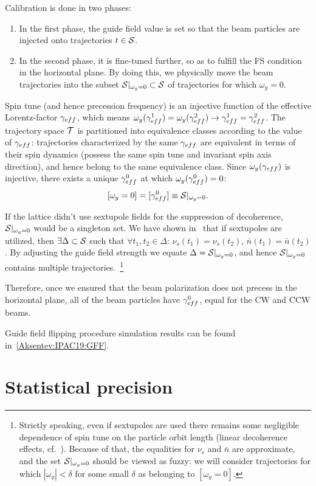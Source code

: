\documentclass[a4paper]{jacow}
\newcommand{\w}{\omega}
\newcommand{\nbar}{\bar n}
\newcommand{\D}{\Delta}
\begin{document}
Calibration is done in two phases:
\begin{enumerate}
\item In the first phase, the guide field value is set so that the beam particles are injected onto trajectories
  $t\in\Stab$.
\item In the second phase, it is fine-tuned further, so as to fulfill the FS condition in the horizontal plane.
  By doing this, we physically move the beam trajectories into the subset $\Stab*\subset\Stab$ of trajectories 
  for which $\w_y = 0$.
\end{enumerate}

Spin tune (and hence precession frequency) is an injective function of the
effective Lorentz-factor $\g*$, which means
$\w_y(\g*^1) = \w_y(\g*^2) \rightarrow \g*^1 = \g*^2$. The trajectory space $\mathcal T$ is partitioned into equivalence
classes according to the value of $\g*$: trajectories characterized by the same $\g*$ are equivalent
in terms of their spin dynamics (possess the same spin tune and invariant spin axis direction),
and hence belong to the same equivalence class.
Since $\w_y(\g*)$ is injective, there exists a unique $\g*^0$ at which $\w_y(\g*^0)=0$:
\[
[\w_y=0] = [\g*^0] \equiv \Stab*.
\]

If the lattice didn't use sextupole fields for the suppression of decoherence,
$\Stab*$ would be a singleton set. We have shown in~\cite{Aksentev:IPAC19:Decoh} that if sextupoles are
utilized, then $\exists\D\subset\Stab$ such that $\forall t_1,t_2\in\D$:
$\nu_s(t_1) = \nu_s(t_2)$, $\nbar(t_1) = \nbar(t_2)$. By adjusting the guide field strength we equate
$\D=\Stab*$, and hence $\Stab*$ contains multiple trajectories.~\footnote{Strictly speaking,
  even if sextupoles are used there remains some negligible dependence of spin tune
  on the particle orbit length (linear decoherence effects, cf.~\cite{Aksentev:IPAC19:Decoh}).
  Because of that, the equalities for $\nu_s$ and $\nbar$ are approximate, and the set $\Stab*$
  should be viewed as fuzzy:
  we will consider trajectories for which $|\w_y|<\delta$ for some small $\delta$ as belonging to $[\w_y=0]$.}

Therefore, once we ensured that the beam polarization does not precess in the horizontal plane,
all of the beam particles have $\g*^0$, equal for the CW and CCW beams.

Guide field flipping procedure simulation results can be found in~\ref{Aksentev:IPAC19:GFF}.


\section{Statistical precision}
 
\end{document}
